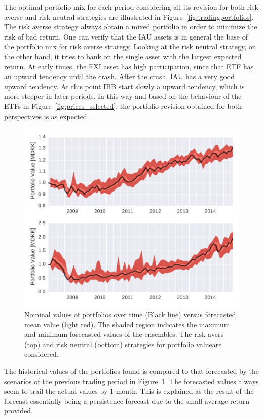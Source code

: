 The optimal portfolio mix for each period considering all its revision for both risk averse and risk neutral strategies are illustrated in Figure~\ref{fig:tradingportfolios}.
The risk averse strategy always obtain a mixed portfolio in order to minimize the risk of bad return.
One can verify that the IAU assets is in general the base of the portfolio mix for risk averse strategy.
Looking at the risk neutral strategy, on the other hand, it tries to bank on the single asset with the largest expected return.
At early times, the FXI asset has high participation, since that ETF has an upward tendency until the crash. After the crash, IAU has a very good upward tendency.
At this point IBB start slowly a upward tendency, which is more steeper in later periods.
In this way and based on the behaviour of the ETFs in Figure~\ref{fig:prices_selected}, the portfolio revision obtained for both perspectives is as expected.

\begin{figure}[tpb]
\centering
\includegraphics[width=1.0\textwidth]{../pic/trading_forecasted_value.pdf}
\caption{Nominal values of portfolios over time (Black line) versus forecasted mean value (light red). The shaded region indicates the maximum and minimum forecasted values of the ensembles. The risk avers (top) and risk neutral (bottom) strategies for portfolio valueare considered.}
\label{fig:tradingforecastedvalues}
\end{figure}

The historical values of the portfolios found is compared to that forecasted by the scenarios of the previous trading period in Figure~\ref{fig:tradingforecastedvalues}.
The forecasted values always seem to trail the actual values by 1 month.
This is explained as the result of the forecast essentially being a persistence forecast due to the small average return provided.

